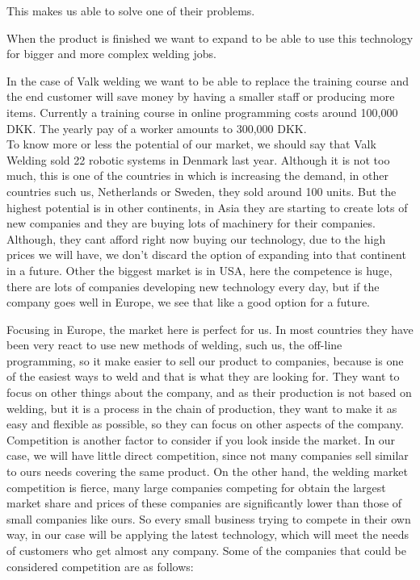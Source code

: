 This makes us able to solve one of their problems. 

When the product is finished we want to expand to be able to use this technology for bigger and more complex welding jobs.

In the case of Valk welding we want to be able to replace the training course and the end customer will save money by having a smaller staff or producing more items. 
Currently a training course in online programming costs around 100,000 DKK. 
The yearly pay of a worker amounts to 300,000 DKK.\\

To know more or less the potential of our market, we should say that Valk Welding sold 22 robotic systems in Denmark last year. Although it is not too much, this is one of the countries in which is increasing the demand, in other countries such us, Netherlands or Sweden, they sold around 100 units. But the highest potential is in other continents, in Asia they are starting to create lots of new companies and they are buying lots of machinery for their companies. Although, they cant afford right now buying our technology, due to the high prices we will have, we don't discard the option of expanding into that continent in a future. Other the biggest market is in USA, here the competence is huge, there are lots of companies developing new technology every day, but if the company goes well in Europe, we see that like a good option for a future.

Focusing in Europe, the market here is perfect for us. In most countries they have been very react to use new methods of welding, such us, the off-line programming, so it make easier to sell our product to companies, because is one of the easiest ways to weld and that is what they are looking for. They want to focus on other things about the company, and as their production is not based on welding, but it is a process in the chain of production, they want to make it as easy and flexible as possible, so they can focus on other aspects of the company.\\

Competition is another factor to consider if you look inside the market. In our case, we will have little direct competition, since not many companies sell similar to ours needs covering the same product. On the other hand, the welding market competition is fierce, many large companies competing for obtain the largest market share and prices of these companies are significantly lower than those of small companies like ours. So every small business trying to compete in their own way, in our case will be applying the latest technology, which will meet the needs of customers who get almost any company.
Some of the companies that could be considered competition are as follows:

